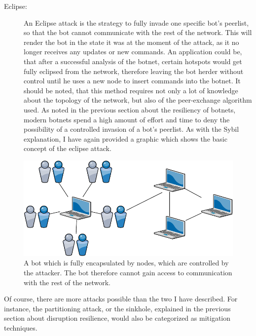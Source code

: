\documentclass[10pt, a4paper, twocolumn]{article} %
\begin{document}
\begin{description}
\item[Eclipse:] An Eclipse attack is the strategy to fully invade one specific bot's peerlist, so that the bot cannot communicate with the rest of the network. This will render the bot in the state it was at the moment of the attack, as it no longer receives any updates or new commands. An application could be, that after a successful analysis of the botnet, certain hotspots would get fully eclipsed from the network, therefore leaving the bot herder without control until he uses a new node to insert commands into the botnet. It should be noted, that this method requires not only a lot of knowledge about the topology of the network, but also of the peer-exchange algorithm used. As noted in the previous section about the resiliency of botnets, modern botnets spend a high amount of effort and time to deny the possibility of a controlled invasion of a bot's peerlist. As with the Sybil explanation, I have again provided a graphic which shows the basic concept of the eclipse attack.

\end{description}
\begin{figure}[ht]
  \centering
  \includegraphics[width=\linewidth]{figures/eclipse}
  \caption{A bot which is fully encapsulated by nodes, which are controlled by the attacker. The bot therefore cannot gain access to communication with the rest of the network.}
  \label{eclipsefig}
\end{figure} 

Of course, there are more attacks possible than the two I have described. For instance, the partitioning attack, or the sinkhole, explained in the previous section about disruption resilience, would also be categorized as mitigation techniques. 
\end{document}
